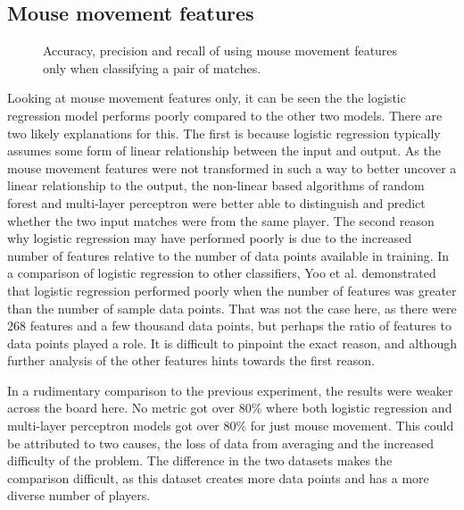 \documentclass[Report.tex]{subfiles}
\newcommand{\baraxis}[8]{
\begin{axis}[
    ybar,
    title={#1},
    width=#5,
    height=#6,
    ymin=#3, ymax=#4,
    bar width=1em,
    legend style={at={#7},anchor=north,legend columns=-1},
    enlarge x limits=0.4,
    x tick label style={align=center,text width=#8},
    symbolic x coords={Logistic Regression, Random Forest, Multi-layer Perceptron},
    xtick=data,
    ylabel={#2}
]
}
\newcommand{\plotbar}[5]{
\addplot+[
	discard if not={numSplits}{#1},
	discard if not={split}{#2},
	discard if not={features}{#3},
] table [x=model, y=#4,col sep=comma] {data/19-pair-cv.csv};
\addlegendentry{#5}
}
\begin{document}

\subsection{Mouse movement features}

\begin{figure}[H]
\centering
{}
\caption{Accuracy, precision and recall of using mouse movement features only when classifying a pair of matches.}
\end{figure}

Looking at mouse movement features only, it can be seen the the logistic regression model performs poorly compared to the other two models. There are two likely explanations for this. The first is because logistic regression typically assumes some form of linear relationship between the input and output. As the mouse movement features were not transformed in such a way to better uncover a linear relationship to the output, the non-linear based algorithms of random forest and multi-layer perceptron were better able to distinguish and predict whether the two input matches were from the same player. The second reason why logistic regression may have performed poorly is due to the increased number of features relative to the number of data points available in training. In a comparison of logistic regression to other classifiers, Yoo et al. \cite{lr-vs-rf} demonstrated that logistic regression performed poorly when the number of features was greater than the number of sample data points. That was not the case here, as there were 268 features and a few thousand data points, but perhaps the ratio of features to data points played a role. It is difficult to pinpoint the exact reason, and although further analysis of the other features hints towards the first reason.

In a rudimentary comparison to the previous experiment, the results were weaker across the board here. No metric got over 80\% where both logistic regression and multi-layer perceptron models got over 80\% for just mouse movement. This could be attributed to two causes, the loss of data from averaging and the increased difficulty of the problem. The difference in the two datasets makes the comparison difficult, as this dataset creates more data points and has a more diverse number of players. 
\end{document}
